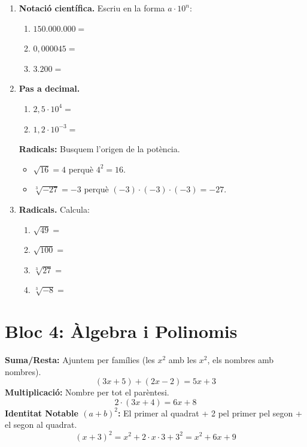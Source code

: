 \documentclass[12pt,a4paper]{article}
\begin{document}
\begin{enumerate}[resume]
    \item \textbf{Notació científica.} Escriu en la forma $a \cdot 10^n$:
    \begin{enumerate}
        \item $150.000.000 =$
        \item $0,000045 =$
        \item $3.200 =$
    \end{enumerate}

    \item \textbf{Pas a decimal.}
    \begin{enumerate}
        \item $2,5 \cdot 10^4 =$ 
        \item $1,2 \cdot 10^{-3} =$ 
    \end{enumerate}

\begin{exemple}
\textbf{Radicals:} Busquem l'origen de la potència.
\begin{itemize}
    \item $\sqrt{16} = 4$ perquè $4^2 = 16$.
    \item $\sqrt[3]{-27} = -3$ perquè $(-3) \cdot (-3) \cdot (-3) = -27$.
\end{itemize}
\end{exemple}

    \item \textbf{Radicals.} Calcula:
    \begin{enumerate}
        \item $\sqrt{49} =$
        \item $\sqrt{100} =$
        \item $\sqrt[3]{27} =$
        \item $\sqrt[3]{-8} =$
    \end{enumerate}
\end{enumerate}

\newpage
\section*{Bloc 4: Àlgebra i Polinomis}

\begin{exemple}
\textbf{Suma/Resta:} Ajuntem per famílies (les $x^2$ amb les $x^2$, els nombres amb nombres).
$$ (3x + 5) + (2x - 2) = 5x + 3 $$
\textbf{Multiplicació:} Nombre per tot el parèntesi.
$$ 2 \cdot (3x + 4) = 6x + 8 $$
\textbf{Identitat Notable $(a+b)^2$:} El primer al quadrat + 2 pel primer pel segon + el segon al quadrat.
$$ (x+3)^2 = x^2 + 2\cdot x \cdot 3 + 3^2 = x^2 + 6x + 9 $$
\end{exemple}
\end{document}
